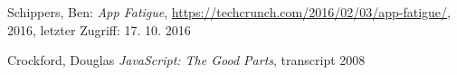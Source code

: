 
\listoffigures %
\listoftables %


\begin{thebibliography}{}
Schippers, Ben: 
\emph{App Fatigue}, 
\url{https://techcrunch.com/2016/02/03/app-fatigue/}, 2016, letzter Zugriff: 17. 10. 2016

Crockford, Douglas 
\emph{JavaScript: The Good Parts}, transcript 2008

\end{thebibliography}

\clearpage\thispagestyle{empty}
\eigen  %












